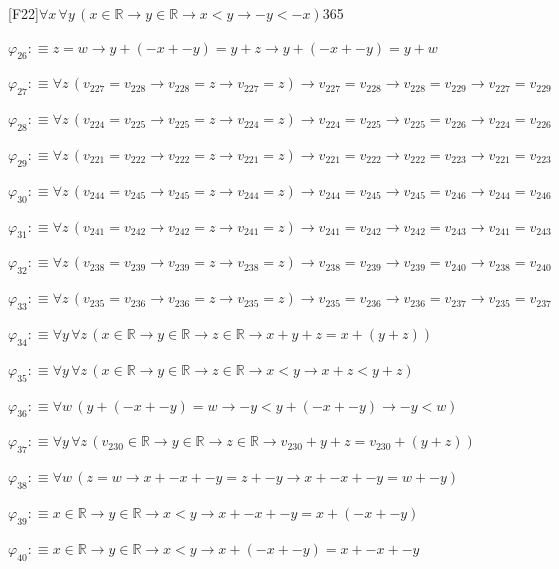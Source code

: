 \begin{fullproof}{[F22]}{$\forall x\,\forall y\,(x \in \mathbb{R} \to y \in \mathbb{R} \to x < y \to -y < -x)$}{365}
\begin{abbrevlist}
\item $\varphi_{26} :\equiv z = w \to y + (-x + -y) = y + z \to y + (-x + -y) = y + w$
\item $\varphi_{27} :\equiv \forall z\,(v_{227} = v_{228} \to v_{228} = z \to v_{227} = z) \to v_{227} = v_{228} \to v_{228} = v_{229} \to v_{227} = v_{229}$
\item $\varphi_{28} :\equiv \forall z\,(v_{224} = v_{225} \to v_{225} = z \to v_{224} = z) \to v_{224} = v_{225} \to v_{225} = v_{226} \to v_{224} = v_{226}$
\item $\varphi_{29} :\equiv \forall z\,(v_{221} = v_{222} \to v_{222} = z \to v_{221} = z) \to v_{221} = v_{222} \to v_{222} = v_{223} \to v_{221} = v_{223}$
\item $\varphi_{30} :\equiv \forall z\,(v_{244} = v_{245} \to v_{245} = z \to v_{244} = z) \to v_{244} = v_{245} \to v_{245} = v_{246} \to v_{244} = v_{246}$
\item $\varphi_{31} :\equiv \forall z\,(v_{241} = v_{242} \to v_{242} = z \to v_{241} = z) \to v_{241} = v_{242} \to v_{242} = v_{243} \to v_{241} = v_{243}$
\item $\varphi_{32} :\equiv \forall z\,(v_{238} = v_{239} \to v_{239} = z \to v_{238} = z) \to v_{238} = v_{239} \to v_{239} = v_{240} \to v_{238} = v_{240}$
\item $\varphi_{33} :\equiv \forall z\,(v_{235} = v_{236} \to v_{236} = z \to v_{235} = z) \to v_{235} = v_{236} \to v_{236} = v_{237} \to v_{235} = v_{237}$
\item $\varphi_{34} :\equiv \forall y\,\forall z\,(x \in \mathbb{R} \to y \in \mathbb{R} \to z \in \mathbb{R} \to x + y + z = x + (y + z))$
\item $\varphi_{35} :\equiv \forall y\,\forall z\,(x \in \mathbb{R} \to y \in \mathbb{R} \to z \in \mathbb{R} \to x < y \to x + z < y + z)$
\item $\varphi_{36} :\equiv \forall w\,(y + (-x + -y) = w \to -y < y + (-x + -y) \to -y < w)$
\item $\varphi_{37} :\equiv \forall y\,\forall z\,(v_{230} \in \mathbb{R} \to y \in \mathbb{R} \to z \in \mathbb{R} \to v_{230} + y + z = v_{230} + (y + z))$
\item $\varphi_{38} :\equiv \forall w\,(z = w \to x + -x + -y = z + -y \to x + -x + -y = w + -y)$
\item $\varphi_{39} :\equiv x \in \mathbb{R} \to y \in \mathbb{R} \to x < y \to x + -x + -y = x + (-x + -y)$
\item $\varphi_{40} :\equiv x \in \mathbb{R} \to y \in \mathbb{R} \to x < y \to x + (-x + -y) = x + -x + -y$

\end{abbrevlist}
\end{fullproof}
